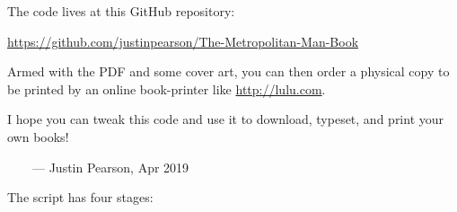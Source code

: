 \documentclass[ebook,12pt]{memoir}
\begin{document}
The code lives at this GitHub repository:

\noindent \url{https://github.com/justinpearson/The-Metropolitan-Man-Book}

Armed with the PDF and some cover art, you can then order a physical copy to be printed by 
an online book-printer like \url{http://lulu.com}.

I hope you can tweak this code and use it to download, typeset, 
and print your own books!

\ \ \ \ --- Justin Pearson, Apr 2019

\normalsize
\cleartoverso


\thispagestyle{empty}



\tiny



\normalsize
\clearpage


\thispagestyle{empty}

\footnotesize
\noindent The script has four stages:
\end{document}
